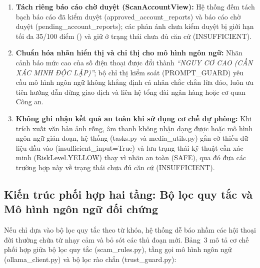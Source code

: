 \documentclass[10pt,a4paper]{article}
\newcommand{\code}[1]{\leavevmode{\normalfont\ttfamily\small #1}}
\newcommand{\codenobreak}[1]{\mbox{\normalfont\ttfamily\small #1}}
\begin{document}
\begin{enumerate}[leftmargin=1.6em, itemsep=2pt]
  \item \textbf{Tách riêng báo cáo chờ duyệt (\codenobreak{ScanAccountView}):} Hệ thống đếm tách bạch báo cáo đã kiểm duyệt (\codenobreak{approved\_account\_reports}) và báo cáo chờ duyệt (\codenobreak{pending\_account\_reports}); các phản ánh chưa kiểm duyệt bị giới hạn tối đa 35/100 điểm (\code{min(35, pending * 15)}) và giữ ở trạng thái chưa đủ căn cứ (\codenobreak{INSUFFICIENT}).
  \item \textbf{Chuẩn hóa nhãn hiển thị và chỉ thị cho mô hình ngôn ngữ:} Nhãn cảnh báo mức cao của số điện thoại được đổi thành \textit{``NGUY CƠ CAO (CẦN XÁC MINH ĐỘC LẬP)''}; bộ chỉ thị kiểm soát (\codenobreak{PROMPT\_GUARD}) yêu cầu mô hình ngôn ngữ không khẳng định cá nhân chắc chắn lừa đảo, luôn ưu tiên hướng dẫn dừng giao dịch và liên hệ tổng đài ngân hàng hoặc cơ quan Công an.
  \item \textbf{Không ghi nhận kết quả an toàn khi sử dụng cơ chế dự phòng:} Khi trích xuất văn bản ảnh rỗng, âm thanh không nhận dạng được hoặc mô hình ngôn ngữ gián đoạn, hệ thống (\codenobreak{tasks.py} và \codenobreak{media\_utils.py}) gắn cờ thiếu dữ liệu đầu vào (\codenobreak{insufficient\_input=True}) và lưu trạng thái kỹ thuật cần xác minh (\codenobreak{RiskLevel.YELLOW}) thay vì nhãn an toàn (\codenobreak{SAFE}), qua đó đưa các trường hợp này về trạng thái chưa đủ căn cứ (\codenobreak{INSUFFICIENT}).
\end{enumerate}

\subsection{Kiến trúc phối hợp hai tầng: Bộ lọc quy tắc và Mô hình ngôn ngữ đối chứng}

Nếu chỉ dựa vào bộ lọc quy tắc theo từ khóa, hệ thống dễ báo nhầm các hội thoại đời thường chứa từ nhạy cảm và bỏ sót các thủ đoạn mới. Bảng~3 mô tả cơ chế phối hợp giữa bộ lọc quy tắc (\codenobreak{scam\_rules.py}), tầng gọi mô hình ngôn ngữ (\codenobreak{ollama\_client.py}) và bộ lọc rào chắn (\codenobreak{trust\_guard.py}):
\end{document}
